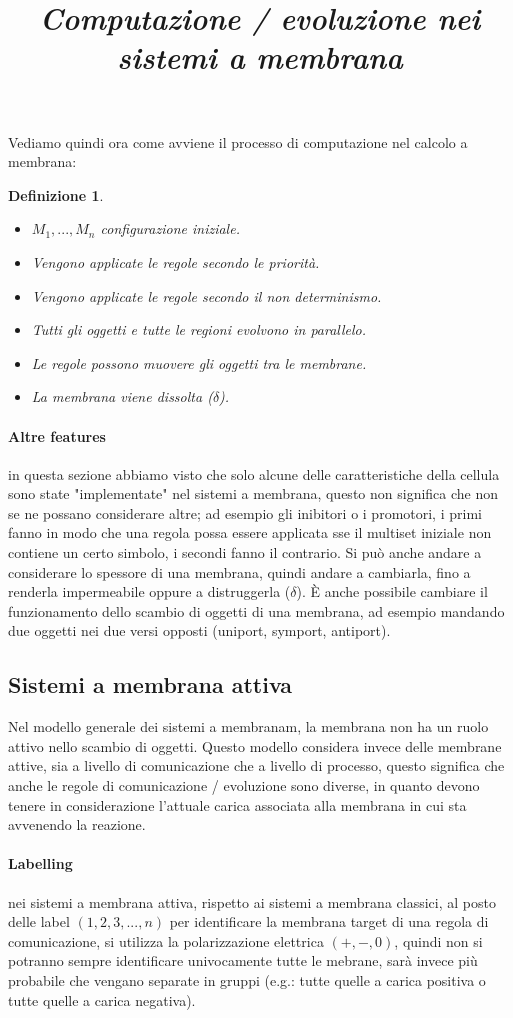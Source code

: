 \documentclass[12pt,a4paper]{report}
\newtheorem{definizione}{Definizione}[section]
\begin{document}
Vediamo quindi ora come avviene il processo di computazione nel calcolo a membrana:
\begin{definizione}
\title{\emph{Computazione / evoluzione nei sistemi a membrana}}
\begin{itemize}
\item $M_{1}, ..., M_{n}$ configurazione iniziale.
\item Vengono applicate le regole secondo le priorità.
\item Vengono applicate le regole secondo il non determinismo.
\item Tutti gli oggetti e tutte le regioni evolvono in parallelo.
\item Le regole possono muovere gli oggetti tra le membrane.
\item La membrana viene dissolta ($\delta$).
\end{itemize}
\end{definizione}

\paragraph{Altre features}
in questa sezione abbiamo visto che solo alcune delle caratteristiche della cellula sono state "implementate" nel sistemi a membrana, questo non significa che non se ne possano considerare altre; ad esempio gli inibitori o i promotori, i primi fanno in modo che una regola possa essere applicata sse il multiset iniziale non contiene un certo simbolo, i secondi fanno il contrario. Si può anche andare a considerare lo spessore di una membrana, quindi andare a cambiarla, fino a renderla impermeabile oppure a distruggerla ($\delta$). È anche possibile cambiare il funzionamento dello scambio di oggetti di una membrana, ad esempio mandando due oggetti nei due versi opposti (uniport, symport, antiport).

\subsection{Sistemi a membrana attiva}
Nel modello generale dei sistemi a membranam, la membrana non ha un ruolo attivo nello scambio di oggetti. Questo modello considera invece delle membrane attive, sia a livello di comunicazione che a livello di processo, questo significa che anche le regole di comunicazione / evoluzione sono diverse, in quanto devono tenere in considerazione l'attuale carica associata alla membrana in cui sta avvenendo la reazione.
\paragraph{Labelling}
nei sistemi a membrana attiva, rispetto ai sistemi a membrana classici, al posto delle label $(1, 2, 3, ..., n)$ per identificare la membrana target di una regola di comunicazione, si utilizza la polarizzazione elettrica $(+, -, 0)$, quindi non si potranno sempre identificare univocamente tutte le mebrane, sarà invece più probabile che vengano separate in gruppi (e.g.: tutte quelle a carica positiva o tutte quelle a carica negativa).
\end{document}
